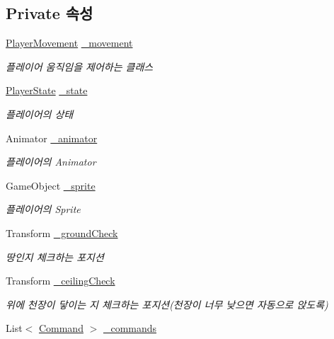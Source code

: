 \subsection*{Private 속성}
\begin{DoxyCompactItemize}
\item 
\mbox{\hyperlink{class_player_movement}{Player\+Movement}} \mbox{\hyperlink{class_player_controller_ad788cfe2e37318d22d52010dc0fecd57}{\+\_\+movement}}
\begin{DoxyCompactList}\small\item\em 플레이어 움직임을 제어하는 클래스 \end{DoxyCompactList}\item 
\mbox{\hyperlink{class_player_state}{Player\+State}} \mbox{\hyperlink{class_player_controller_addcd33a9c23c1b949964365390c7a6eb}{\+\_\+state}}
\begin{DoxyCompactList}\small\item\em 플레이어의 상태 \end{DoxyCompactList}\item 
Animator \mbox{\hyperlink{class_player_controller_ada29d77d333483963257e51a6e15b8ae}{\+\_\+animator}}
\begin{DoxyCompactList}\small\item\em 플레이어의 Animator \end{DoxyCompactList}\item 
Game\+Object \mbox{\hyperlink{class_player_controller_aeb0b2dc2ef34062f72afaf20899ce307}{\+\_\+sprite}}
\begin{DoxyCompactList}\small\item\em 플레이어의 Sprite \end{DoxyCompactList}\item 
Transform \mbox{\hyperlink{class_player_controller_ae4940f9e37dd5bf49788de933a833377}{\+\_\+ground\+Check}}
\begin{DoxyCompactList}\small\item\em 땅인지 체크하는 포지션 \end{DoxyCompactList}\item 
Transform \mbox{\hyperlink{class_player_controller_a932dbf6c5cc4527856596dc1f9df1426}{\+\_\+ceiling\+Check}}
\begin{DoxyCompactList}\small\item\em 위에 천장이 닿이는 지 체크하는 포지션(천장이 너무 낮으면 자동으로 앉도록) \end{DoxyCompactList}\item 
List$<$ \mbox{\hyperlink{class_command}{Command}} $>$ \mbox{\hyperlink{class_player_controller_aab899fbdea369867174253d2efd978fe}{\+\_\+commands}}

\end{DoxyCompactItemize}
